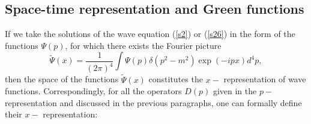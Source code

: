 \documentclass[a4paper,a4paper]{article}
\begin{document}
\subsection{Space-time representation and Green functions}

If we take the solutions of the wave equation (\ref{s2}) or (\ref{s26}) in
the form of the functions $\Psi (p)$, for which there exists the Fourier
picture 
\begin{equation}
\tilde{\Psi}(x)=\frac{1}{(2\pi )^{4}}\int \Psi (p)\delta (p^{2}-m^{2})\exp
(-ipx)d^{4}p,  \label{s109}
\end{equation}%
then the space of the functions $\tilde{\Psi}(x)$ constitutes the $x-$
representation of wave functions. Correspondingly, for all the operators $%
D(p)$ given in the $p-$ representation and discussed in the previous
paragraphs, one can formally define their $x-$ representation:
\end{document}

